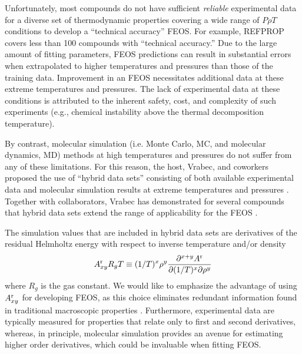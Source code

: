 \documentclass[12pt,a4paper]{article}
\begin{document}

Unfortunately, most compounds do not have sufficient \textit{reliable} experimental data for a diverse set of thermodynamic properties covering a wide range of $P \rho T$ conditions to develop a ``technical accuracy'' FEOS. For example, REFPROP covers less than 100 compounds with ``technical accuracy.'' Due to the large amount of fitting parameters, FEOS predictions can result in substantial errors when extrapolated to higher temperatures and pressures than those of the training data. Improvement in an FEOS necessitates additional data at these extreme temperatures and pressures. The lack of experimental data at these conditions is attributed to the inherent safety, cost, and complexity of such experiments (e.g., chemical instability above the thermal decomposition temperature).

By contrast, molecular simulation (i.e. Monte Carlo, MC, and molecular dynamics, MD) methods at high temperatures and pressures do not suffer from any of these limitations. For this reason, the host, Vrabec, and coworkers proposed the use of ``hybrid data sets'' consisting of both available experimental data and molecular simulation results at extreme temperatures and pressures  \cite{Rutkai2013}. Together with collaborators, Vrabec has  demonstrated for several compounds that hybrid data sets extend the range of applicability for the FEOS \cite{Thol2016_siloxane_first,Thol2016_siloxane,Thol2017,Rutkai2013,Thol2015}. 

The simulation values that are included in hybrid data sets are derivatives of the residual Helmholtz energy with respect to inverse temperature and/or density
\begin{equation} \label{Residual Derivatives}
A_{xy}^{\rm r} R_gT \equiv (1/T)^x\rho^y \frac{\partial^{x+y}A^{\rm r}}{\partial(1/T)^x \partial \rho^y}
\end{equation}
where $R_g$ is the gas constant. We would like to emphasize the advantage of using $A_{xy}^{\rm r}$ for developing FEOS, as this choice eliminates redundant information found in traditional macroscopic properties \cite{Thol2016_LJ,Thol_LJTS,Rutkai2017,Lustig2015,Rutkai2013,Rutkai2015}. Furthermore, experimental data are typically measured for properties that relate only to first and second derivatives, whereas, in principle, molecular simulation provides an avenue for estimating higher order derivatives, which could be invaluable when fitting FEOS. 
\end{document}

